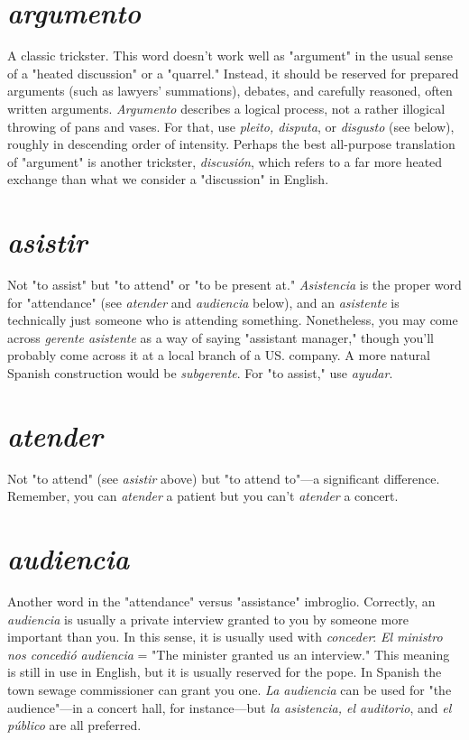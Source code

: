 \documentclass[14pt,a4paper,oneside]{memoir}
\begin{document}
\section{\emph{argumento}}

A classic trickster. This word doesn't work
well as "argument" in the usual sense of a "heated discussion" or a
"quarrel." Instead, it should be reserved for prepared arguments (such
as lawyers' summations), debates, and carefully reasoned, often written
arguments. \emph{Argumento} describes a logical process, not a rather illogical throwing of pans and vases. For that, use \emph{pleito, disputa}, or \emph{disgusto} (see below), roughly in descending order of intensity. Perhaps the
best all-purpose translation of "argument" is another trickster, \emph{discusión}, which refers to a far more heated exchange than what we consider a "discussion" in English.

\section{\emph{asistir}}

Not "to assist" but "to attend" or "to be present at."
\emph{Asistencia} is the proper word for "attendance" (see \emph{atender} and \emph{audiencia} below), and an \emph{asistente} is technically just someone who is attending something. Nonetheless, you may come across \emph{gerente asistente} as a way of saying "assistant manager," though you'll probably
come across it at a local branch of a US. company. A more natural
Spanish construction would be \emph{subgerente}. For "to assist," use \emph{ayudar}.

\section{\emph{atender}}

Not "to attend" (see \emph{asistir} above) but "to attend
to"---a significant difference. Remember, you can \emph{atender} a patient but you can't \emph{atender} a concert.

\section{\emph{audiencia}}

Another word in the "attendance" versus "assistance" imbroglio. Correctly, an \emph{audiencia} is usually a private interview granted to you by someone more important than you. In this
sense, it is usually used with \emph{conceder}: \emph{El ministro nos concedió audiencia} = "The minister granted us an interview." This meaning is
still in use in English, but it is usually reserved for the pope. In Spanish the town sewage commissioner can grant you one. \emph{La audiencia}
can be used for "the audience"---in a concert hall, for instance---but \emph{la
asistencia, el auditorio}, and \emph{el público} are all preferred.
\end{document}
